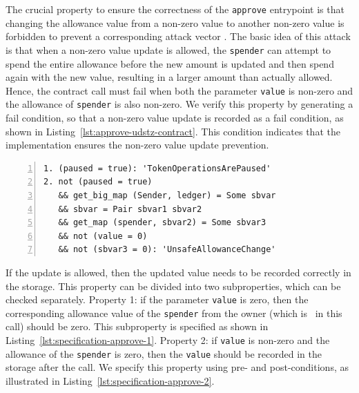 \documentclass[a4paper,USenglish,cleveref, autoref,anonymous]{lipics-v2021}
\begin{document}
The crucial property to ensure the correctness of the \texttt{approve}
entrypoint is that changing the allowance value from a non-zero value
to another non-zero value is forbidden to prevent a corresponding
attack vector \cite{attack-vector}. The basic idea of this attack is
that when a non-zero value update is allowed, the \lstinline/spender/
can attempt to spend the entire allowance before the new amount is
updated and then spend again with the new value, resulting in a larger
amount than actually allowed. Hence, the contract call must fail when
both the parameter \lstinline/value/ is non-zero and the allowance of
\lstinline/spender/ is also non-zero. We verify this property by
generating a fail condition, so that a non-zero value update is
recorded as a fail condition, as shown in
Listing~\ref{lst:approve-udstz-contract}. This condition indicates
that the implementation ensures the non-zero value update prevention. 
\begin{lstlisting}[float=tp,captionpos=b,caption={Fail conditions for the \lstinline/approve/ entrypoint},label={lst:approve-udstz-contract},numbers=left]
1. (paused = true): 'TokenOperationsArePaused'
2. not (paused = true) 
   && get_big_map (Sender, ledger) = Some sbvar 
   && sbvar = Pair sbvar1 sbvar2 
   && get_map (spender, sbvar2) = Some sbvar3 
   && not (value = 0) 
   && not (sbvar3 = 0): 'UnsafeAllowanceChange'
\end{lstlisting}
If the update is allowed, then the updated value needs to be recorded
correctly in the storage. This property can be divided into two
subproperties, which can be checked separately. Property 1: if the
parameter \lstinline/value/ is zero, then the 
corresponding allowance value of the \lstinline/spender/ from the
owner (which is \SENDER\ in this call) should be zero. This
subproperty is specified as shown in
Listing~\ref{lst:specification-approve-1}. Property 2: if
\lstinline/value/ is non-zero and the allowance of the \lstinline/spender/ is zero, then the \lstinline/value/ should be recorded in the storage after the call. We specify this property using pre- and post-conditions, as illustrated in Listing~\ref{lst:specification-approve-2}.
\end{document}
